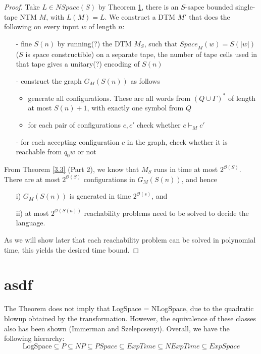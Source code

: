 \documentclass{report}
\newcommand{\NSpace}{\text{$\mathit{NSpace}$}\xspace}
\newcommand{\Space}{\text{$\mathit{Space}$}\xspace}
\newcommand{\bigO}{\text{$\mathcal{O}$}\xspace}
\begin{document}
\begin{proof} Take $L \in \NSpace(S)$ by Theorem \ref{}, there is an $S$-sapce bounded single-tape NTM $M$, with $L(M) = L$. We construct a DTM $M'$ that does the following on every input $w$ of length $n$:
\begin{itemize}
\item[-] fine $S(n)$ by running(?) the DTM $M_S$, such that $\Space_M(w) = S(|w|)$ ($S$ is space constructible) on a separate tape,  the number of tape cells used in that tape gives a unitary(?) encoding of $S(n)$
\item[-] construct the graph $G_M(S(n))$ as follows
\begin{itemize}
\item generate all configurations. These are all words from $(Q \cup \Gamma)^*$ of length at most $S(n)+1$, with exactly one symbol from $Q$
\item for each pair of configurations $c,c'$ check whether $c \vdash_M c'$
\end{itemize}
\item[-] for each accepting configuration $c$ in the graph, check whether it is reachable from $q_0w$ or not
\end{itemize}
From Theorem \ref{3.3} (Part 2), we know that $M_S$ runs in time at most $2^{\bigO(S)}$. There are at most $2^{\bigO(S)}$ configurations in $G_M(S(n))$, and hence
\begin{itemize}
\item[i)]$G_M(S(n))$ is generated in time $2^{\bigO(s)}$, and 
\item[ii)]at most $2^{\bigO(S(n))}$ reachability problems need to be solved to decide the language.
\end{itemize}
As we will show later that each reachability problem can be solved in polynomial time, this yields the desired time bound. 
\end{proof}

\section{asdf}
The Theorem does not imply that LogSpace = NLogSpace, due to the quadratic blowup obtained by the transformation. However, the equivalence of these classes also has been shown (Immerman and Szelepcsenyi). Overall, we have the following hierarchy:
\[ \text{LogSpace} \subseteq P \subseteq NP \subseteq PSpace \subseteq ExpTime \subseteq NExpTime \subseteq ExpSpace\]
\end{document}
